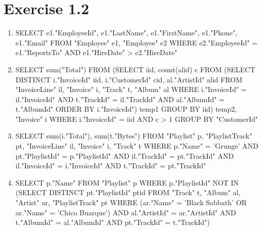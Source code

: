 \documentclass[10pt]{article}
\begin{document}
  \section*{Exercise 1.2}
  \begin{enumerate}[label=\arabic*.]
  \item
 	SELECT e1."EmployeeId", e1."LastName", e1."FirstName", e1."Phone", e1."Email" 
	FROM "Employee" e1, "Employee" e2 
	WHERE e2."EmployeeId" =  e1."ReportsTo" AND e1."HireDate" > e2."HireDate"
  \item
    SELECT sum("Total") FROM 
	(SELECT iid, count(alid) c FROM (SELECT DISTINCT i."InvoiceId" iid, i."CustomerId" cid, al."ArtistId" alid FROM "InvoiceLine" il, "Invoice" i, "Track" t, "Album" al
	WHERE i."InvoiceId" = il."InvoiceId" AND t."TrackId" = il."TrackId" AND al."AlbumId" = t."AlbumId" ORDER BY i."InvoiceId") temp1 GROUP BY iid) temp2,
	"Invoice" i
WHERE
i."InvoiceId" = iid AND c > 1 GROUP BY "CustomerId"
  \item
    SELECT sum(i."Total"), sum(t."Bytes")
    FROM "Playlist" p, "PlaylistTrack" pt, "InvoiceLine" il, "Invoice" i, "Track" t
    WHERE p."Name" = 'Grunge' AND pt."PlaylistId" = p."PlaylistId" AND il."TrackId" = pt."TrackId" AND il."InvoiceId" = i."InvoiceId" AND t."TrackId" = pt."TrackId"
  \item
    SELECT p."Name" FROM "Playlist" p
    WHERE p."PlaylistId" NOT IN (SELECT DISTINCT pt."PlaylistId" ptid FROM "Track" t, "Album" al, "Artist" ar, "PlaylistTrack" pt
    WHERE (ar."Name" = 'Black Sabbath' OR ar."Name" = 'Chico Buarque') AND al."ArtistId" = ar."ArtistId" AND t."AlbumId" = al."AlbumId" AND pt."TrackId" = t."TrackId")
\end{enumerate}
\end{document}
